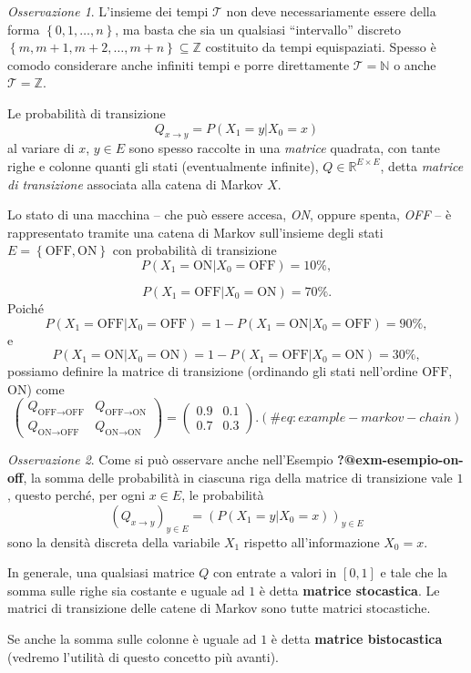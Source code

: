 \documentclass[
  italian,
  letterpaper,
]{book}
\newcommand{\bra}[1]{\left( #1 \right)}
\newcommand{\cur}[1]{\left\{ #1 \right\}}
\theoremstyle{definition}
\theoremstyle{remark}
\newtheorem*{remark}{Osservazione}
\begin{document}
\begin{remark}
L'insieme dei tempi \(\mathcal{T}\) non deve necessariamente essere
della forma \(\cur{0,1, \ldots, n}\), ma basta che sia un qualsiasi
``intervallo'' discreto
\(\cur{m, m+1, m+2, \ldots, m+n} \subseteq \mathbb{Z}\) costituito da
tempi equispaziati. Spesso è comodo considerare anche infiniti tempi e
porre direttamente \(\mathcal{T} = \mathbb{N}\) o anche
\(\mathcal{T} = \mathbb{Z}\).
\end{remark}

Le probabilità di transizione \[ Q_{x \to y} = P(X_1 = y | X_0=x)\] al
variare di \(x\), \(y \in E\) sono spesso raccolte in una \emph{matrice}
quadrata, con tante righe e colonne quanti gli stati (eventualmente
infinite), \(Q \in \mathbb{R}^{E \times E}\), detta \emph{matrice di
transizione} associata alla catena di Markov \(X\).

\protect{}\label{esempio-on-off}
Lo stato di una macchina -- che può essere accesa, \emph{ON}, oppure
spenta, \emph{OFF} -- è rappresentato tramite una catena di Markov
sull'insieme degli stati \(E = \cur{\text{OFF}, \text{ON}}\) con
probabilità di transizione
\[ P(X_1 = \text{ON} | X_0 = \text{OFF}) = 10\%,\]

\[ P(X_1 = \text{OFF} | X_0 = \text{ON}) =70\%.\] Poiché
\[ P(X_1 = \text{OFF} | X_0 = \text{OFF}) = 1- P(X_1 = \text{ON} | X_0 = \text{OFF}) = 90\%,\]
e
\[ P(X_1 = \text{ON} | X_0 = \text{ON}) = 1- P(X_1 = \text{OFF} | X_0 = \text{ON}) = 30\%,\]
possiamo definire la matrice di transizione (ordinando gli stati
nell'ordine \(\text{OFF}\), \(\text{ON}\)) come
\[\bra{ \begin{array}{cc} Q_{\text{OFF} \to \text{OFF}} & Q_{\text{OFF} \to \text{ON}} \\
 Q_{\text{ON} \to \text{OFF}} & Q_{\text{ON} \to \text{ON}} \end{array}} =  \bra{ \begin{array}{cc} 0.9 & 0.1 \\ 0.7 & 0.3 \end{array}}. (\#eq:example-markov-chain)\]

\begin{remark}
Come si può osservare anche nell'Esempio \textbf{?@exm-esempio-on-off},
la somma delle probabilità in ciascuna riga della matrice di transizione
vale \(1\), questo perché, per ogni \(x\in E\), le probabilità
\[ (Q_{x \to y})_{y \in E}  = ( P(X_1 = y| X_0 = x))_{y \in E}\] sono la
densità discreta della variabile \(X_1\) rispetto all'informazione
\(X_0=x\).

In generale, una qualsiasi matrice \(Q\) con entrate a valori in
\([0,1]\) e tale che la somma sulle righe sia costante e uguale ad \(1\)
è detta \textbf{matrice stocastica}. Le matrici di transizione delle
catene di Markov sono tutte matrici stocastiche.

Se anche la somma sulle colonne è uguale ad \(1\) è detta
\textbf{matrice bistocastica} (vedremo l'utilità di questo concetto più
avanti).
\end{remark}
\end{document}
